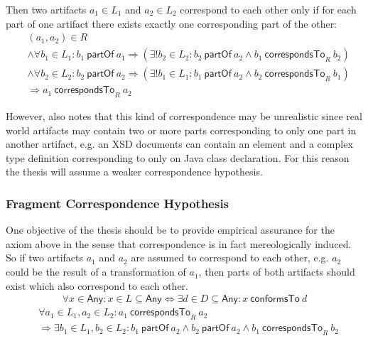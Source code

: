 \documentclass[runningheads,a4paper]{llncs}
\newcommand{\Any}{\textsf{Any}}
\newcommand{\partOf}{~\textsf{partOf}~}
\newcommand{\correspondsToR}[1]{~\textsf{correspondsTo}_{#1}~}
\newcommand{\conformsTo}{~\textsf{conformsTo}~}
\begin{document}
Then two artifacts $a_1 \in L_1$ and $a_2 \in L_2$ correspond to each other only if for each part of one artifact there exists exactly one corresponding part of the other:
\begin{align*}
&(a_1,a_2) \in R
\\&\wedge \forall b_1 \in L_1 : b_1 \partOf a_1 \Rightarrow (\exists! b_2 \in L_2 : b_2 \partOf a_2 \wedge b_1 \correspondsToR{R} b_2 )
\\&\wedge \forall b_2 \in L_2 : b_2 \partOf a_2 \Rightarrow (\exists! b_1 \in L_1 : b_1 \partOf a_2 \wedge b_2 \correspondsToR{R} b_1 )
\\&\Rightarrow a_1 \correspondsToR{R} a_2
\end{align*}

However, \cite{DBLP:conf/sle/Lammel16} also notes that this kind of correspondence may be unrealistic since real world artifacts may contain two or more parts corresponding to only one part in another artifact, e.g. an XSD documents can contain an element and a complex type definition corresponding to only on Java class declaration.
For this reason the thesis will assume a weaker correspondence hypothesis.

\subsubsection{Fragment Correspondence Hypothesis}
One objective of the thesis should be to provide empirical assurance for the axiom above in the sense that correspondence is in fact mereologically induced.
So if two artifacts $a_1$ and $a_2$ are assumed to correspond to each other, e.g. $a_2$ could be the result of a transformation of $a_1$, then parts of both artifacts should exist which also correspond to each other.
\begin{align*}
\forall x \in \Any :
x \in L \subseteq \Any \Leftrightarrow \exists d \in D \subseteq \Any : x \conformsTo d
\end{align*}
\begin{align*}
&\forall a_1 \in L_1, a_2 \in L_2 : 
a_1 \correspondsToR{R} a_2
\\&\Rightarrow 
\exists b_1 \in L_1, b_2 \in L_2 : 
b_1 \partOf a_2 \wedge b_2 \partOf a_2 \wedge b_1 \correspondsToR{R} b_2
\end{align*}
\end{document}
